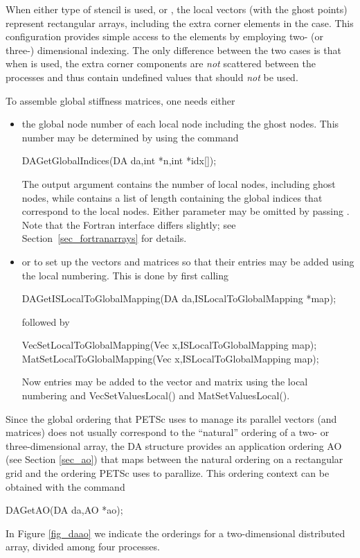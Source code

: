 When either type of stencil is used,  or 
, the local vectors (with the ghost points) 
represent rectangular arrays, including the extra corner elements in 
the  case. This configuration provides simple 
access to the elements by employing two- (or three-) dimensional indexing. 
The only difference between the 
two cases is that when  is used, the extra 
corner components are {\em not} scattered between the processes and thus
contain undefined values that should {\em not} be used.

To assemble global stiffness matrices, one needs either 
\begin{itemize}
\item
the global node number of each local node 
including the ghost nodes. This number may be determined by using the 
command 
\begin{tabbing}
  DAGetGlobalIndices(DA da,int *n,int *idx[]);
\end{tabbing}
The output argument  contains the number of 
local nodes, including ghost nodes, while  contains a list of length
 containing the global indices that correspond to the local nodes. Either
parameter may be omitted by passing . Note that the Fortran
interface differs slightly; see Section~\ref{sec_fortranarrays} for details.
\item
or to set up the vectors and matrices so that their entries may be
added using the local numbering. This is done by first calling 
\begin{tabbing}
  DAGetISLocalToGlobalMapping(DA da,ISLocalToGlobalMapping *map);
\end{tabbing}
followed by 
\begin{tabbing}
  VecSetLocalToGlobalMapping(Vec x,ISLocalToGlobalMapping map);\\
  MatSetLocalToGlobalMapping(Vec x,ISLocalToGlobalMapping map);
\end{tabbing}
Now entries may be added to the vector and matrix using the local numbering
and VecSetValuesLocal() and MatSetValuesLocal().
\end{itemize}

Since the global ordering that PETSc uses to manage its parallel vectors 
(and matrices) does not usually correspond to the ``natural'' ordering 
of a two- or three-dimensional array, the DA structure provides 
an application ordering AO (see Section \ref{sec_ao}) that maps 
between the natural ordering on a rectangular grid and the ordering PETSc
uses to parallize. This ordering context can be obtained with the command
\begin{tabbing}
  DAGetAO(DA da,AO *ao);
\end{tabbing}
In Figure \ref{fig_daao} we indicate the orderings for a two-dimensional distributed 
array, divided among four processes.

